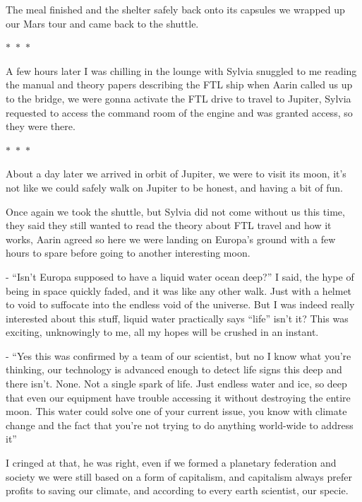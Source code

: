 \documentclass[colorlinks,12pt,a4paper]{book}
\newcommand\sep{\begin{center}
  \boldmath $\ast$~$\ast$~$\ast$
\end{center}}
\begin{document}
The meal finished and the shelter safely back onto its capsules we wrapped up our Mars tour and came back to the shuttle.

\sep

A few hours later I was chilling in the lounge with Sylvia snuggled to me reading the manual and theory papers 
describing the FTL ship when Aarin called us up to the bridge, we were gonna activate the FTL drive to travel to Jupiter, 
Sylvia requested to access the command room of the engine and was granted access, so they were there.

\sep

About a day later we arrived in orbit of Jupiter, we were to visit its moon, it's not like we could 
safely walk on Jupiter to be honest, and having a bit of fun.\par
\bigskip

Once again we took the shuttle, but Sylvia did not come without us this time, they said they still wanted to read the 
theory about FTL travel and how it works, Aarin agreed so here we were landing on Europa's ground with a few hours to 
spare before going to another interesting moon.\par
\bigskip


- “Isn't Europa supposed to have a liquid water ocean deep?” I said, the hype of being in space quickly faded, and it was 
like any other walk. Just with a helmet to void to suffocate into the endless void of the universe. 
But I was indeed really interested about this stuff, liquid water practically says “life” isn't it? This was exciting,
 unknowingly to me, all my hopes will be crushed in an instant.\par
 \bigskip

- “Yes this was confirmed by a team of our scientist, but no I know what you're thinking, our technology is advanced 
enough to detect life signs this deep and there isn't. None. Not a single spark of life. Just endless water and ice, 
so deep that even our equipment have trouble accessing it without destroying the entire moon. This water could 
solve one of your current issue, you know with climate change and the fact that you're not trying to do anything 
world-wide to address it”\par
\bigskip

I cringed at that, he was right, even if we formed a planetary federation and society we were still based on a form of 
capitalism, and capitalism always prefer profits to saving our climate, and according to every earth scientist, our specie.\par
\bigskip
\end{document}
